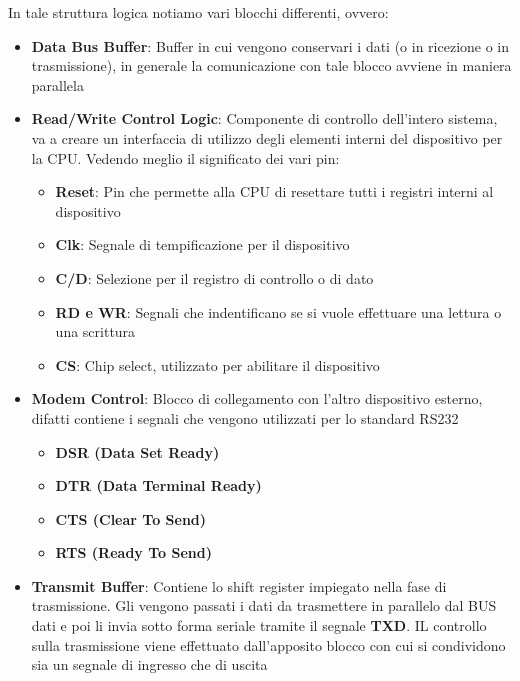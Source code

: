 In tale struttura logica notiamo vari blocchi differenti, ovvero:
\begin{itemize}
    \item \textbf{Data Bus Buffer}: Buffer in cui vengono conservari i dati (o in ricezione o in trasmissione), in generale la comunicazione con tale blocco avviene in maniera parallela
    \item \textbf{Read/Write Control Logic}: Componente di controllo dell'intero sistema, va a creare un interfaccia di utilizzo degli elementi interni del dispositivo per la CPU. Vedendo meglio il significato dei vari pin:
    \begin{itemize}
        \item \textbf{Reset}: Pin che permette alla CPU di resettare tutti i registri interni al dispositivo
        \item \textbf{Clk}: Segnale di tempificazione per il dispositivo
        \item \textbf{C/D}: Selezione per il registro di controllo o di dato
        \item \textbf{RD e WR}: Segnali che indentificano se si vuole effettuare una lettura o una scrittura
        \item \textbf{CS}: Chip select, utilizzato per abilitare il dispositivo
    \end{itemize} 

    \item \textbf{Modem Control}: Blocco di collegamento con l'altro dispositivo esterno, difatti contiene i segnali che vengono utilizzati per lo standard RS232
    \begin{itemize}
        \item \textbf{DSR (Data Set Ready)}
        \item \textbf{DTR (Data Terminal Ready)}
        \item \textbf{CTS (Clear To Send)}
        \item \textbf{RTS (Ready To Send)}
    \end{itemize}

    \item \textbf{Transmit Buffer}: Contiene lo shift register impiegato nella fase di trasmissione. Gli vengono passati i dati da trasmettere in parallelo dal BUS dati e poi li invia sotto forma seriale tramite il segnale \textbf{TXD}. IL controllo sulla trasmissione viene effettuato dall'apposito blocco con cui si condividono sia un segnale di ingresso che di uscita
    

\end{itemize}
